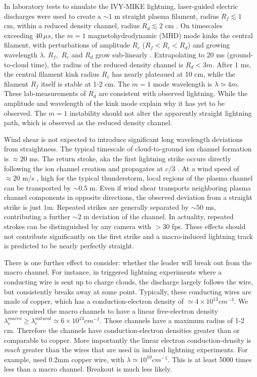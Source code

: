 \documentclass[%
 reprint,
 amsmath,amssymb,
 aps,
]{revtex4-2}
\newcommand{\vtwo}[1]{{\color{black} #1}}
\newcommand{\vfour}[1]{{\color{red} #1}}
\begin{document}
        In laboratory tests to simulate the IVY-MIKE lightning, laser-guided electric discharges were used to create a ${\sim 1}$ m straight plasma filament, radius $R_f\lesssim 1$ cm, within a reduced density channel, radius $R_d \lesssim 2$ cm \citep[][fig. 6]{IVY-MIKE1987}. On timescales exceeding $40 \, \mu s$, the $m=1$ magnetohydrodynamic (MHD) mode kinks the central filament, with perturbations of amplitude $R_e$ ($R_f < R_e < R_d$) and growing wavelength $\lambda$. $R_f$,\, $R_e$ and $R_d$ grow sub-linearly \citep[][fig. 9]{IVY-MIKE1987}. Extrapolating to 20 ms (ground-to-cloud time), the radius of the reduced density channel is $R_d<3m$. After 1 ms, the central filament kink radius $R_e$ has nearly plateaued at 10 cm, while the filament $R_f$ itself is stable at 1-2 cm. The $m=1$ mode wavelength is $\lambda\simeq4 m$. These lab-measurements of $R_d$ are consistent with observed lightning. While the amplitude and wavelength of the kink mode explain why it has yet to be observed. The $m=1$ instability should not alter the apparently straight lightning path, which is observed as the reduced density channel.

        Wind shear is not expected to introduce significant long wavelength deviations from straightness. The typical timescale of cloud-to-ground ion channel formation is ${\approx 20}$ ms. The return stroke, aka the first lightning strike \vtwo{\citep{DwyerUman2014}} occurs directly following the ion channel creation and propagates at $c/3$ \vtwo{\citep{Idone1987}}. At a wind speed of ${\approx 20}$ m/s \vtwo{\citep{Choi2004}}, high for the typical thunderstorm, local regions of the plasma channel can be transported by ${\sim 0.5}$ m. Even if wind shear transports neighboring plasma channel components in opposite directions, the observed deviation from a straight strike is just $1$m. Repeated strikes are generally separated by ${\sim 50}$ ms, contributing a further ${\sim 2}$ m deviation of the channel. In actuality, repeated strokes can be distinguished by any camera with $>30$ fps. These effects should not contribute significantly on the first strike and a macro-induced lightning track is predicted to be nearly perfectly straight.
        
        \vfour{There is one further effect to consider: whether the leader will break out from the macro channel. For instance, in triggered lightning experiments where a conducting wire is sent up to charge clouds, the discharge largely follows the wire, but consistently breaks away at some point. Typically, these conducting wires are made of copper, which has a conduction-electron density of $\simeq 4 \times 10^{13} cm^{-3}$. We have required the macro channels to have a linear free-electron density $\lambda_e^{macro} \geq \lambda_e^{natural} \simeq 6 \times 10^{13} cm^{-1}$. Those channels have a maximum radius of 1-2 cm. Therefore the channels have conduction-electron densities greater than or comparable to copper. More importantly the linear electron conduction-density is \textit{much} greater than the wires that are used in induced lightning experiments. For example, \citeauthor{Betts2003} \citep{Betts2003} used 0.2mm copper wire, with $\lambda\simeq 10^{10} cm^{-1}$. This is at least 5000 times less than a macro channel. Breakout is much less likely.}
\end{document}
